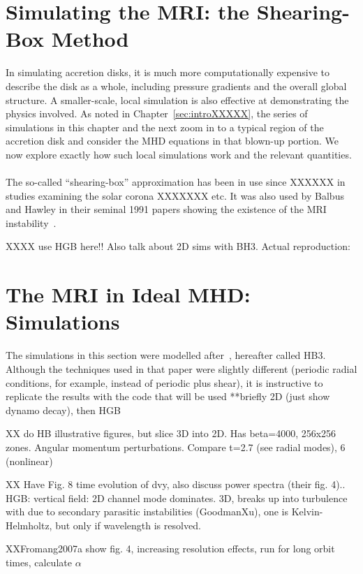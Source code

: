 \section{Simulating the MRI: the Shearing-Box Method} \label{sec:mrisbideal}
In simulating accretion disks, it is much more computationally expensive to describe the disk as a whole, including pressure gradients and the overall global structure. A smaller-scale, local simulation is also effective at demonstrating the physics involved. As noted in Chapter~\ref{sec:introXXXXX}, the series of simulations in this chapter and the next zoom in to a typical region of the accretion disk and consider the MHD equations in that blown-up portion. We now explore exactly how such local simulations work and the relevant quantities.\\
\\
The so-called ``shearing-box'' approximation has been in use since XXXXXX in studies examining the solar corona XXXXXXX etc. It was also used by Balbus and Hawley in their seminal 1991 papers showing the existence of the MRI instability~\cite{BH1991a, BH1991b, BH1991c}. 


XXXX use HGB here!! Also talk about 2D sims with BH3. Actual reproduction: 

\section{The MRI in Ideal MHD: Simulations} \label{sec:mrisimideal}
The simulations in this section were modelled after~\cite{XXXXXXBH1991c}, hereafter called HB3. Although the techniques used in that paper were slightly different (periodic radial conditions, for example, instead of periodic plus shear), it is instructive to replicate the results with the code that will be used
**briefly 2D (just show dynamo decay), then HGB

XX do HB illustrative figures, but slice 3D into 2D. Has beta=4000, 256x256 zones. Angular momentum perturbations. Compare t=2.7 (see radial modes), 6 (nonlinear) 

XX Have Fig. 8 time evolution of dvy, also discuss power spectra (their fig. 4)..
HGB: vertical field: 2D channel mode dominates. 3D, breaks up into turbulence with due to secondary parasitic instabilities (GoodmanXu), one is Kelvin-Helmholtz, but only if wavelength is resolved.

XXFromang2007a show fig. 4, increasing resolution effects, run for long orbit times, calculate $\alpha$

